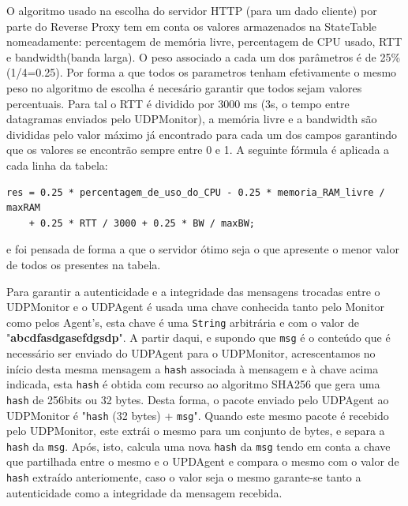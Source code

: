 \documentclass{article}
\begin{document}
O algoritmo usado na escolha do servidor HTTP (para um dado cliente) por parte do Reverse Proxy tem em conta os valores armazenados na StateTable nomeadamente: percentagem de memória livre, percentagem de CPU usado, RTT e bandwidth(banda larga). O peso associado a cada um dos parâmetros é de 25\%(1/4=0.25). Por forma a que todos os parametros tenham efetivamente o mesmo peso no algoritmo de escolha é necesário garantir que todos sejam valores percentuais. Para tal o RTT é dividido por 3000 ms (3s, o tempo entre datagramas enviados pelo UDPMonitor), a memória livre e a bandwidth são divididas pelo valor máximo já encontrado para cada um dos campos garantindo que os valores se encontrão sempre entre 0 e 1. A seguinte fórmula é aplicada a cada linha da tabela:
\begin{verbatim}
res = 0.25 * percentagem_de_uso_do_CPU - 0.25 * memoria_RAM_livre / maxRAM 
	+ 0.25 * RTT / 3000 + 0.25 * BW / maxBW;
\end{verbatim}
e foi pensada de forma a que o servidor ótimo seja o que apresente o menor valor de todos os presentes na tabela.

Para garantir a autenticidade e a integridade das mensagens trocadas entre o UDPMonitor e o UDPAgent é usada uma chave conhecida tanto pelo Monitor como pelos Agent's, esta chave é uma \texttt{String} arbitrária e com o valor de "\textbf{abcdfasdgasefdgsdp}". A partir daqui, e supondo que \texttt{msg} é o conteúdo que é necessário ser enviado do UDPAgent para o UDPMonitor, acrescentamos no início desta mesma mensagem a \texttt{hash} associada à mensagem e à chave acima indicada, esta \texttt{hash} é obtida com recurso ao algoritmo SHA256 que gera uma \texttt{hash} de 256bits ou 32 bytes. Desta forma, o pacote enviado pelo UDPAgent ao UDPMonitor é "\texttt{hash} (32 bytes) + \texttt{msg}". Quando este mesmo pacote é recebido pelo UDPMonitor, este extrái o mesmo para um conjunto de bytes, e separa a \texttt{hash} da \texttt{msg}. Após, isto, calcula uma nova \texttt{hash} da \texttt{msg} tendo em conta a chave que partilhada entre o mesmo e o UPDAgent e compara o mesmo com o valor de \texttt{hash} extraído anteriomente, caso o valor seja o mesmo garante-se tanto a autenticidade como a integridade da mensagem recebida.
\end{document}
